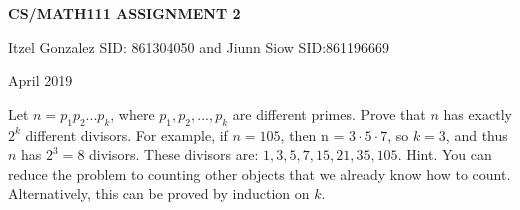 \documentclass{article}
\begin{document}
\centerline{\large \bf CS/MATH111 ASSIGNMENT 2}
\centerline{Itzel Gonzalez SID: 861304050 and Jiunn Siow SID:861196669}
\centerline{April 2019}

\vskip 0.1in


\vskip 0.2in

\begin{problem}
Let $n = p_1 p_2 ... p_k$, where $p_1, p_2, ..., p_k$ are different primes. Prove that $n$ has exactly $2^k$ different divisors. 
For example, if $n = 105$, then n = $3 \cdot 5 \cdot 7$, so $k = 3$, and thus $n$ has $2^3 = 8$ divisors. These divisors are: $1, 3, 5, 7, 15, 21, 35, 105$.
Hint. You can reduce the problem to counting other objects that we already know how to count. Alternatively, this can be proved by induction on $k$.
\end{problem}
\end{document}
